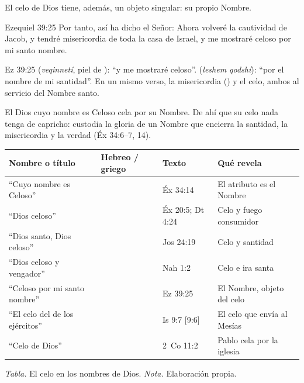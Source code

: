 El celo de Dios tiene, además, un objeto singular: su propio Nombre.

\begin{verso}{Ezequiel 39:25}
Por tanto, así ha dicho \SENOR{} el Señor: Ahora volveré la cautividad de Jacob, y tendré misericordia de toda la casa de Israel, y me mostraré celoso por mi santo nombre.
\end{verso}

\begin{filologiatexto}{Ez 39:25}
 (\emph{veqinnetí}, piel de ): ``y me mostraré celoso''.  (\emph{leshem qodshí}): ``por el nombre de mi santidad''. En un mismo verso, la misericordia () y el celo, ambos al servicio del Nombre santo.
\end{filologiatexto}

El Dios cuyo nombre es Celoso cela por su Nombre. De ahí que su celo nada tenga de capricho: custodia la gloria de un Nombre que encierra la santidad, la misericordia y la verdad (Éx 34:6--7, 14).

\begin{center}
\small\renewcommand{\arraystretch}{1.2}
\begin{tabular}{@{}L{4.2cm}L{3.6cm}L{3.0cm}L{4.6cm}@{}}
\toprule
\textbf{Nombre o título} & \textbf{Hebreo / griego} & \textbf{Texto} & \textbf{Qué revela} \\ \midrule
``Cuyo nombre es Celoso'' &  & Éx 34:14 & El atributo es el Nombre \\
``Dios celoso'' &  & Éx 20:5; Dt 4:24 & Celo y fuego consumidor \\
``Dios santo, Dios celoso'' &  & Jos 24:19 & Celo y santidad \\
``Dios celoso y vengador'' &  & Nah 1:2 & Celo e ira santa \\
``Celoso por mi santo nombre'' &  & Ez 39:25 & El Nombre, objeto del celo \\
``El celo del \SENOR{} de los ejércitos'' &  & Is 9:7 [9:6] & El celo que envía al Mesías \\
``Celo de Dios'' &  & 2~Co 11:2 & Pablo cela por la iglesia \\ \bottomrule
\end{tabular}\par\smallskip
{\footnotesize\color{gris}\textit{Tabla.} El celo en los nombres de Dios. \textit{Nota.} Elaboración propia.}
\end{center}

